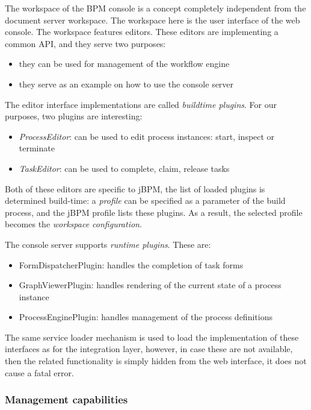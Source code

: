 The workspace of the BPM console is a concept completely independent from the
document server workspace. The workspace here is the user interface of the web
console. The workspace features editors. These editors are implementing a
common API, and they serve two purposes:

\begin{itemize}
\item they can be used for management of the workflow engine
\item they serve as an example on how to use the console server
\end{itemize}

The editor interface implementations are called \emph{buildtime plugins}. For our
purposes, two plugins are interesting:

\begin{itemize}
\item \emph{ProcessEditor}: can be used to edit process instances: start, inspect or terminate
\item \emph{TaskEditor}: can be used to complete, claim, release tasks
\end{itemize}

Both of these editors are specific to jBPM, the list of loaded plugins is
determined build-time: a \emph{profile} can be specified as a parameter of the
build process, and the jBPM profile lists these plugins. As a result, the
selected profile becomes the \emph{workspace configuration}.

The console server supports \emph{runtime plugins}. These are:

\begin{itemize}
\item FormDispatcherPlugin: handles the completion of task forms
\item GraphViewerPlugin: handles rendering of the current state of a process instance
\item ProcessEnginePlugin: handles management of the process definitions
\end{itemize}

The same service loader mechanism is used to load the implementation of these
interfaces as for the integration layer, however, in case these are not
available, then the related functionality is simply hidden from the web
interface, it does not cause a fatal error.

\subsubsection*{Management capabilities}

